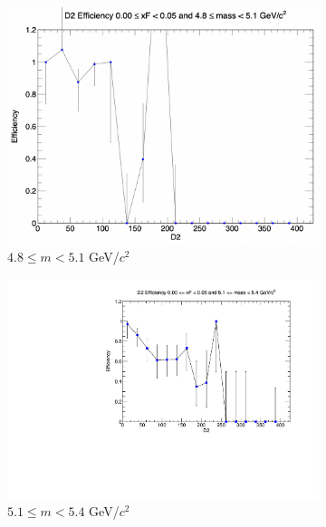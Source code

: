 \begin{figure}[p]
\begin{subfigure}[b]{0.32\textwidth}
        \centering
        \includegraphics[width=\textwidth]{./kTrackerEfficiencyPlots/D2_Efficiency_xF0_mass2.png}
        \caption{$4.8 \leq m < 5.1$ GeV/$c^2$}
        \label{fig:xF0_mass2}
    \end{subfigure}
    \vspace{0.5cm}
    \begin{subfigure}[b]{0.32\textwidth}
        \centering
        \includegraphics[width=\textwidth]{./kTrackerEfficiencyPlots/D2_Efficiency_xF0_mass3.pdf}
        \caption{$5.1 \leq m < 5.4$ GeV/$c^2$}
        \label{fig:xF0_mass3}
    \end{subfigure}
    \hfill
    \begin{subfigure}[b]{0.32\textwidth}
        \centering

\end{subfigure}
\end{figure}
